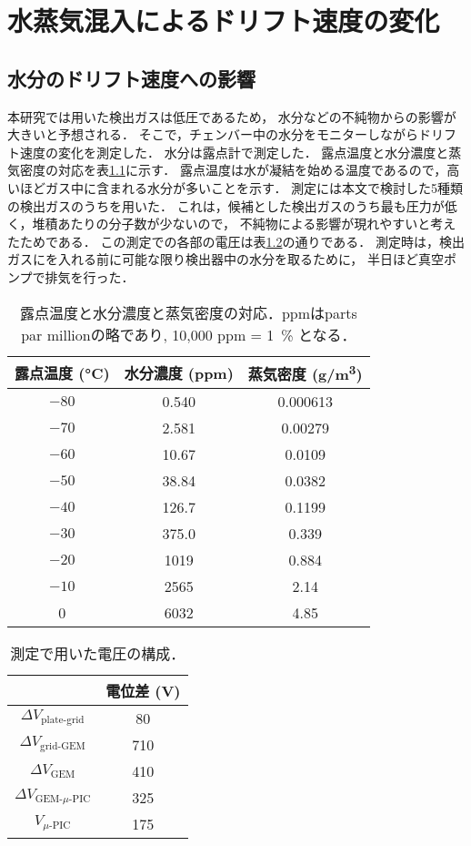 \documentclass[../master]{subfiles}
\begin{document}
\chapter{水蒸気混入によるドリフト速度の変化}
\label{app::drift_speed_humid_dep}
\section{水分のドリフト速度への影響}
本研究では用いた検出ガスは低圧であるため，
水分などの不純物からの影響が大きいと予想される．
そこで，チェンバー中の水分をモニターしながらドリフト速度の変化を測定した．
水分は露点計で測定した．
露点温度と水分濃度と蒸気密度の対応を表\ref{tab::dew_point_humidity}に示す．
露点温度は水が凝結を始める温度であるので，高いほどガス中に含まれる水分が多いことを示す．
測定には本文で検討した5種類の検出ガスのうち\Methane を用いた．
これは，候補とした検出ガスのうち最も圧力が低く，堆積あたりの分子数が少ないので，
不純物による影響が現れやすいと考えたためである．
この測定での各部の電圧は表\ref{tab::configuration_for_drift_dep}の通りである．
測定時は，検出ガスにを入れる前に可能な限り検出器中の水分を取るために，
半日ほど真空ポンプで排気を行った．
\begin{table}
  \centering
  \caption{露点温度と水分濃度と蒸気密度の対応．ppmはparts par millionの略であり, 10,000 ppm = \SI{1}{\percent} となる．}
  \label{tab::dew_point_humidity}
  \begin{tabular}{ccc}
    \toprule
    露点温度 (\si{\degreeCelsius}) & 水分濃度 (ppm) & 蒸気密度 (\si{\gram/\cubic\metre}) \\
    \midrule
    $-80$ & 0.540 & 0.000613 \\
    $-70$ & 2.581 & 0.00279 \\
    $-60$ & 10.67 & 0.0109 \\
    $-50$ & 38.84 & 0.0382 \\
    $-40$ & 126.7 & 0.1199 \\
    $-30$ & 375.0 & 0.339 \\
    $-20$ & 1019 & 0.884 \\
    $-10$ & 2565 & 2.14 \\
    0     & 6032 & 4.85 \\
    \bottomrule
  \end{tabular}
\end{table}
\begin{table}
  \centering
  \caption{測定で用いた電圧の構成．}
  \label{tab::configuration_for_drift_dep}
  \begin{tabular}{cc}
    \toprule
    & 電位差 (\si{\volt}) \\
    \midrule
    $\Delta V_{\text{plate-grid}}$ & 80 \\
    $\Delta V_{\text{grid-GEM}}$ & 710 \\
    $\Delta V_{\text{GEM}}$ & 410 \\
    $\Delta V_{\text{GEM-}\mu\text{-PIC}}$ & 325 \\
    $V_{\mu\text{-PIC}}$ & 175 \\
    \bottomrule
  \end{tabular}
\end{table}
\end{document}

